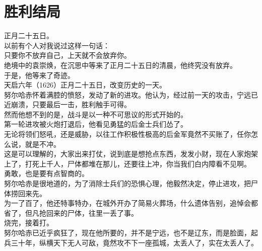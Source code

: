 \section{胜利结局}
\ifnum{}
	\begin{multicols}{\theparacolNo}
\fi
正月二十五日。\\

以前有个人对我说过这样一句话：\\

只要你不放弃自己，上天就不会放弃你。\\

绝境中的袁崇焕，在沉思中等来了正月二十五日的清晨，他终究没有放弃。\\

于是，他等来了奇迹。\\

天启六年（1626）正月二十五日，改变历史的一天。\\

努尔哈赤怀着满腔的愤怒，发动了新的进攻。他认为，经过前一天的攻击，宁远已近崩溃，只要最后一击，胜利触手可得。\\

然而他想不到的是，战斗是以一种不可思议的形式开始的。\\

第一轮进攻被火炮打退后，他看见勇猛的后金士兵们怂了。\\

无论将领们怒吼，还是威胁，以往工作积极性极高的后金军竟然不买账了，任你怎么说，就是不冲。\\

这是可以理解的，大家出来打仗，说到底是想抢点东西，发发小财，现在人家炮架上了，打死上千人，尸体都堆在那儿，还要往上冲，你当我们白内障看不见啊。\\

勇敢，也是要有点智商的。\\

努尔哈赤是很地道的，为了消除士兵们的恐惧心理，他毅然决定，停止进攻，把尸体捞回来先。\\

为一了百了，他还特事特办，在城外开办了简易火葬场，什么遗体告别，追悼会都省了，但凡抢回来的尸体，往里一丢了事。\\

烧完，接着打。\\

努尔哈赤已近乎疯狂了，现在他所要的，并不是宁远，也不是辽东，而是脸面，起兵三十年，纵横天下无人可敌，竟然攻不下一座孤城，太丢人了，实在太丢人了。\\


\end{multicols}
